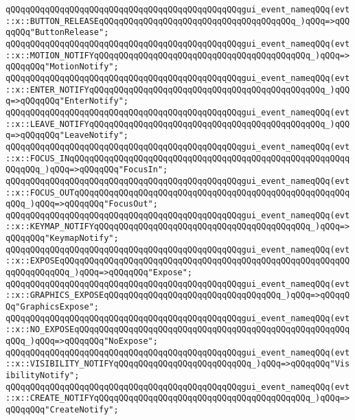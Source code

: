 \verb|qQQqqQQqqQQqqQQqqQQqqQQqqQQqqQQqqQQqqQQqqQQqqQQqgui_event_nameqQQq(evt::x::BUTTON_RELEASEqQQqqQQqqQQqqQQqqQQqqQQqqQQqqQQqqQQqqQQq_)qQQq=>qQQqqQQq"ButtonRelease";|\newline
\verb|qQQqqQQqqQQqqQQqqQQqqQQqqQQqqQQqqQQqqQQqqQQqqQQqgui_event_nameqQQq(evt::x::MOTION_NOTIFYqQQqqQQqqQQqqQQqqQQqqQQqqQQqqQQqqQQqqQQqqQQq_)qQQq=>qQQqqQQq"MotionNotify";|\newline
\verb|qQQqqQQqqQQqqQQqqQQqqQQqqQQqqQQqqQQqqQQqqQQqqQQqgui_event_nameqQQq(evt::x::ENTER_NOTIFYqQQqqQQqqQQqqQQqqQQqqQQqqQQqqQQqqQQqqQQqqQQqqQQq_)qQQq=>qQQqqQQq"EnterNotify";|\newline
\verb|qQQqqQQqqQQqqQQqqQQqqQQqqQQqqQQqqQQqqQQqqQQqqQQqgui_event_nameqQQq(evt::x::LEAVE_NOTIFYqQQqqQQqqQQqqQQqqQQqqQQqqQQqqQQqqQQqqQQqqQQqqQQq_)qQQq=>qQQqqQQq"LeaveNotify";|\newline
\verb|qQQqqQQqqQQqqQQqqQQqqQQqqQQqqQQqqQQqqQQqqQQqqQQqgui_event_nameqQQq(evt::x::FOCUS_INqQQqqQQqqQQqqQQqqQQqqQQqqQQqqQQqqQQqqQQqqQQqqQQqqQQqqQQqqQQqqQQq_)qQQq=>qQQqqQQq"FocusIn";|\newline
\verb|qQQqqQQqqQQqqQQqqQQqqQQqqQQqqQQqqQQqqQQqqQQqqQQqgui_event_nameqQQq(evt::x::FOCUS_OUTqQQqqQQqqQQqqQQqqQQqqQQqqQQqqQQqqQQqqQQqqQQqqQQqqQQqqQQqqQQq_)qQQq=>qQQqqQQq"FocusOut";|\newline
\verb|qQQqqQQqqQQqqQQqqQQqqQQqqQQqqQQqqQQqqQQqqQQqqQQqgui_event_nameqQQq(evt::x::KEYMAP_NOTIFYqQQqqQQqqQQqqQQqqQQqqQQqqQQqqQQqqQQqqQQqqQQq_)qQQq=>qQQqqQQq"KeymapNotify";|\newline
\verb|qQQqqQQqqQQqqQQqqQQqqQQqqQQqqQQqqQQqqQQqqQQqqQQqgui_event_nameqQQq(evt::x::EXPOSEqQQqqQQqqQQqqQQqqQQqqQQqqQQqqQQqqQQqqQQqqQQqqQQqqQQqqQQqqQQqqQQqqQQqqQQq_)qQQq=>qQQqqQQq"Expose";|\newline
\verb|qQQqqQQqqQQqqQQqqQQqqQQqqQQqqQQqqQQqqQQqqQQqqQQqgui_event_nameqQQq(evt::x::GRAPHICS_EXPOSEqQQqqQQqqQQqqQQqqQQqqQQqqQQqqQQqqQQq_)qQQq=>qQQqqQQq"GraphicsExpose";|\newline
\verb|qQQqqQQqqQQqqQQqqQQqqQQqqQQqqQQqqQQqqQQqqQQqqQQqgui_event_nameqQQq(evt::x::NO_EXPOSEqQQqqQQqqQQqqQQqqQQqqQQqqQQqqQQqqQQqqQQqqQQqqQQqqQQqqQQqqQQq_)qQQq=>qQQqqQQq"NoExpose";|\newline
\verb|qQQqqQQqqQQqqQQqqQQqqQQqqQQqqQQqqQQqqQQqqQQqqQQqgui_event_nameqQQq(evt::x::VISIBILITY_NOTIFYqQQqqQQqqQQqqQQqqQQqqQQqqQQq_)qQQq=>qQQqqQQq"VisibilityNotify";|\newline
\verb|qQQqqQQqqQQqqQQqqQQqqQQqqQQqqQQqqQQqqQQqqQQqqQQqgui_event_nameqQQq(evt::x::CREATE_NOTIFYqQQqqQQqqQQqqQQqqQQqqQQqqQQqqQQqqQQqqQQqqQQq_)qQQq=>qQQqqQQq"CreateNotify";|\newline
